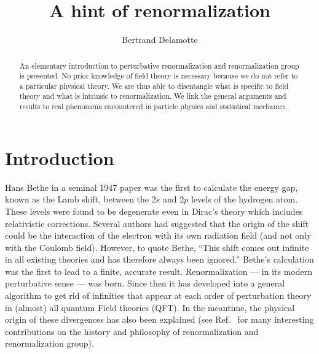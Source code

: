 \documentclass[floatfix,preprintnumbers,amsmath,amssymb,prb,12pt]{revtex4-1}
\begin{document}
\title{A hint of renormalization}
\author{Bertrand Delamotte}

\begin{abstract}
An elementary introduction to perturbative renormalization and
renormalization group is presented. No prior knowledge of field
theory is necessary because we do not refer to a particular
physical theory. We are thus able to
disentangle what is specific to field theory and what is intrinsic
to renormalization. We link the general arguments and results to
real phenomena encountered in particle physics and statistical
mechanics.
\end{abstract}

\maketitle

\section{Introduction}
Hans Bethe in a seminal 1947 paper was
the first to calculate the energy gap, known as the Lamb shift, 
between the 2$s$ and 2$p$ levels of the hydrogen
atom.\cite{bethe47} These levels were found to be degenerate even
in Dirac's theory which includes relativistic corrections. Several
authors had suggested that the origin of the shift could be the
interaction of the electron with its own radiation field (and not
only with the Coulomb field). However, to quote Bethe, ``This
shift comes out infinite in all existing theories and has
therefore always been ignored.'' Bethe's calculation was the first
to lead to a finite, accurate result. Renormalization --- in its
modern perturbative sense --- was born.\cite{weinberg95} Since
then it has developed into a general algorithm to get rid of
infinities that appear at each order of perturbation theory in
(almost) all quantum Field theories
(QFT).\cite{collins84,ryder85,lebellac91,binney92,goldenfeld92} In
the meantime, the physical origin of these divergences has also
been explained (see Ref.~ for many interesting
contributions on the history and philosophy of renormalization
and renormalization group). 
\end{document}
